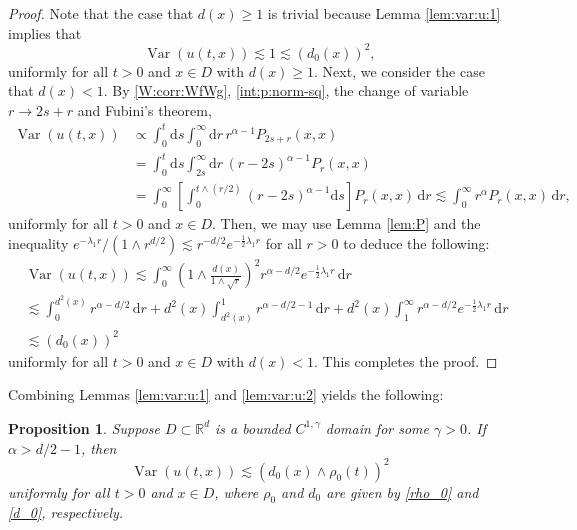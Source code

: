 \documentclass[reqno]{amsart}
\DeclareMathOperator{\Var}{Var}
\newcommand{\R}{\mathbb R}
\renewcommand{\d}{\mathrm d}
\newcommand{\1}{\mathbf 1}
\numberwithin{equation}{section}
\newtheorem{proposition}[theorem]{Proposition}
\theoremstyle{definition}
\begin{document}
\begin{proof}
Note that the case that $d(x) \ge 1$ is trivial because Lemma \ref{lem:var:u:1} implies that
\[
	\Var(u(t,x)) \lesssim 1 \lesssim (d_0(x))^2,
\]
uniformly for all $t>0$ and $x \in D$ with $d(x) \ge 1$.
Next, we consider the case that $d(x)<1$.
By \eqref{W:corr:WfWg}, \eqref{int:p:norm-sq}, the change of variable $r \to 2s+r$ and Fubini's theorem,
\begin{align*}
	\Var(u(t,x)) 
	&\propto \int_0^t \d s \int_0^\infty \d r \, r^{\alpha-1} P_{2s+r}(x,x)\\
	&= \int_0^t \d s \int_{2s}^\infty \d r \, (r-2s)^{\alpha-1} P_r(x,x)\\
	&= \int_0^\infty \left[\int_0^{t \wedge (r/2)} (r-2s)^{\alpha-1}  \d s \right] P_r(x,x) \, \d r
	\lesssim \int_0^\infty r^{\alpha} P_r(x,x) \, \d r,
\end{align*}
uniformly for all $t>0$ and $x \in D$.
Then, we may use Lemma \ref{lem:P} and the inequality $e^{-\lambda_1 r}/(1 \wedge r^{d/2}) \lesssim r^{-d/2}e^{-\frac12 \lambda_1 r}$ for all $r>0$ to deduce the following:
\begin{align*}
	&\Var(u(t,x))
	\lesssim \int_0^\infty \left( 1 \wedge \frac{d(x)}{1\wedge \sqrt{r}} \right)^2 r^{\alpha-d/2} e^{-\frac12\lambda_1 r} \, \d r\\
	& \lesssim \int_0^{d^2(x)} r^{\alpha-d/2} \, \d r + d^2(x) \int_{d^2(x)}^1 r^{\alpha-d/2-1} \, \d r + d^2(x)\int_1^\infty r^{\alpha-d/2} e^{-\frac12\lambda_1 r} \, \d r\\
	&\lesssim (d_0(x))^2
\end{align*}
uniformly for all $t>0$ and $x \in D$ with $d(x)<1$.
This completes the proof.
\end{proof}

Combining Lemmas \ref{lem:var:u:1} and \ref{lem:var:u:2} yields the following:

\begin{proposition}\label{prop:var:u}
Suppose $D \subset \R^d$ is a bounded $C^{1,\gamma}$ domain for some $\gamma>0$.
If $\alpha>d/2-1$, then
\[
	\Var(u(t,x)) \lesssim (d_0(x) \wedge \rho_0(t))^2
\]
uniformly for all $t>0$ and $x \in D$, where $\rho_0$ and $d_0$ are given by \eqref{rho_0} and \eqref{d_0}, respectively.
\end{proposition}
\end{document}
